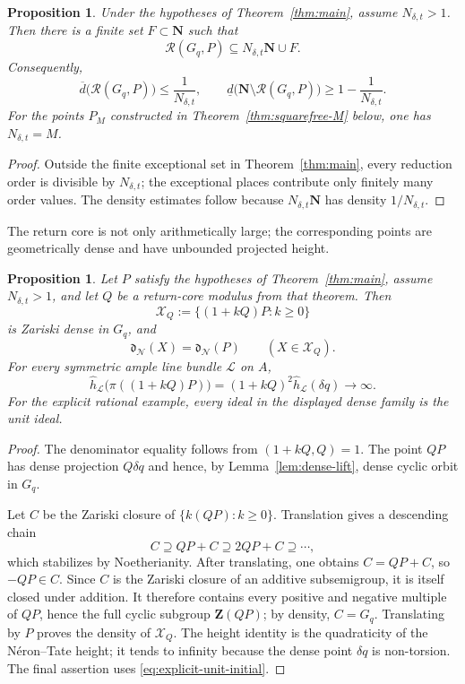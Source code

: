 \documentclass[11pt,letterpaper,reqno]{amsart}
\newtheorem{proposition}[theorem]{Proposition}
\theoremstyle{definition}
\theoremstyle{remark}
\newcommand{\N}{\mathbf N}
\newcommand{\dd}{\mathfrak d}
\newcommand{\Ner}{\mathcal N}
\begin{document}
\begin{proposition}
\label{prop:sparse-orders-general}
Under the hypotheses of Theorem~\ref{thm:main}, assume $N_{\delta,t}>1$.  Then
there is a finite set $F\subset\N$
such that
\[
 \mathscr R(G_q,P)\subseteq N_{\delta,t}\N\cup F.
\]
Consequently,
\[
 \overline d\bigl(\mathscr R(G_q,P)\bigr)
 \le\frac1{N_{\delta,t}},
 \qquad
 \underline d\bigl(\N\setminus\mathscr R(G_q,P)\bigr)
 \ge1-\frac1{N_{\delta,t}}.
\]
For the points $P_M$ constructed in
Theorem~\ref{thm:squarefree-M} below, one has $N_{\delta,t}=M$.
\end{proposition}

\begin{proof}
Outside the finite exceptional set in Theorem~\ref{thm:main}, every reduction order
is divisible by $N_{\delta,t}$; the exceptional places contribute only
finitely many order values.  The density estimates follow because
$N_{\delta,t}\N$ has density $1/N_{\delta,t}$.
\end{proof}

The return core is not only arithmetically large; the corresponding points are
geometrically dense and have unbounded projected height.

\begin{proposition}
\label{thm:gcd-height-decoupling}
Let $P$ satisfy the hypotheses of Theorem~\ref{thm:main}, assume
$N_{\delta,t}>1$, and let $Q$ be a return-core modulus from that theorem.  Then
\[
 \mathcal X_Q:=\{(1+kQ)P:k\ge0\}
\]
is Zariski dense in $G_q$, and
\[
 \dd_{\Ner}(X)=\dd_{\Ner}(P)
 \qquad(X\in\mathcal X_Q).
\]
For every symmetric ample line bundle $\mathcal L$ on $A$,
\[
 \widehat h_{\mathcal L}\bigl(\pi((1+kQ)P)\bigr)
 =(1+kQ)^2\widehat h_{\mathcal L}(\delta q)
 \longrightarrow\infty.
\]
For the explicit rational example, every ideal in the displayed dense family
is the unit ideal.
\end{proposition}

\begin{proof}
The denominator equality follows from $(1+kQ,Q)=1$.  The point $QP$ has dense
projection $Q\delta q$ and hence, by Lemma~\ref{lem:dense-lift}, dense cyclic orbit
in $G_q$.

Let $C$ be the Zariski closure of $\{k(QP):k\ge0\}$.  Translation gives a
descending chain
\[
 C\supseteq QP+C\supseteq2QP+C\supseteq\cdots,
\]
which stabilizes by Noetherianity.  After translating, one obtains
$C=QP+C$, so $-QP\in C$.  Since $C$ is the Zariski closure of an
additive subsemigroup, it is itself closed under addition.  It therefore
contains every positive and negative multiple of $QP$, hence the full cyclic
subgroup $\mathbf Z(QP)$; by density, $C=G_q$.  Translating by $P$ proves the
density of $\mathcal X_Q$.  The height identity is the quadraticity of the
N\'eron--Tate height; it tends to infinity because the dense point $\delta q$
is non-torsion.  The final assertion uses
\eqref{eq:explicit-unit-initial}.
\end{proof}
\end{document}
